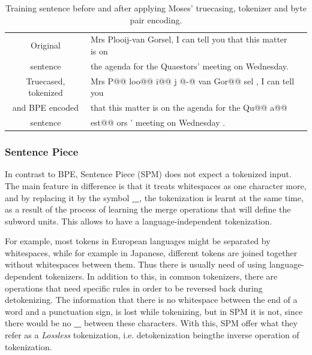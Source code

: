 \documentclass[11pt,english,listoffigures,listoftables]{tfgetsinf}
\begin{document}
\begin{table}
    \caption{Training sentence before and after applying Moses' truecasing, tokenizer and byte pair encoding.}
\centering
\begin{tabular}{|c|l|c}
\hline
    Original & Mrs Plooij-van Gorsel, I can tell you that this matter is on \\
    
    sentence & the agenda for the Quaestors' meeting on Wednesday.\\
\hline
    Truecased, tokenized & Mrs P@@ loo@@ i@@ j @-@ van Gor@@ sel , I can tell you  \\
    and BPE encoded & that this matter is on the agenda for the Qu@@ a@@ \\
    sentence & est@@ ors ' meeting on Wednesday .\\ 
\hline
\end{tabular}
\label{table:bpe}
\end{table}





\subsubsection{Sentence Piece}
In contrast to BPE, Sentence Piece (SPM) \cite{https://doi.org/10.48550/arxiv.1808.06226} does not expect a tokenized input. The main feature in difference is that it treats whitespaces as one character more, and by replacing it by the symbol \textbf{\_}, the tokenization is learnt at the same time, as a result of the process of learning the merge operations that will define the subword units. This allows to have a language-independent tokenization. 

For example, most tokens in European languages might be separated by whitespaces, while for example in Japanese, different tokens are joined together without whitespaces between them. Thus there is usually need of using language-dependent tokenizers.
In addition to this, in common tokenizers, there are operations that need specific rules in order to be reversed back during detokenizing. The information that there is no whitespace between the end of a word and a punctuation sign, is lost while tokenizing, but in SPM it is not, since there would be no \textbf{\_} between these characters. With this, SPM offer what they refer as a \textit{Lossless} tokenization, i.e. detokenization beingthe inverse operation of tokenization.
\end{document}
